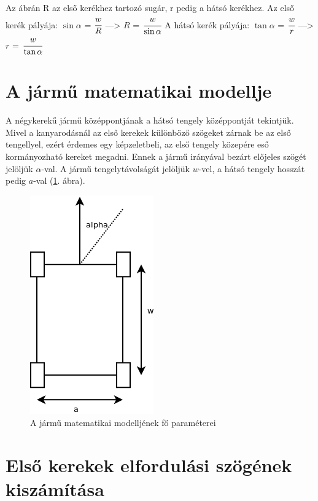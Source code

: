 \documentclass[a4paper]{paper}
\begin{document}
Az ábrán R az első kerékhez tartozó sugár, r pedig a hátsó kerékhez.\newline
Az első kerék pályája: $\sin\alpha$ = $\cfrac{w}{R}$ \hspace{5mm}---> \hspace{5mm} $R$ = $\cfrac{w}{\sin\alpha}$ \newline
A hátsó kerék pályája: $\tan\alpha$ = $\cfrac{w}{r}$ \hspace{5mm}---> \hspace{5mm} $r$ = $\cfrac{w}{\tan\alpha}$
\newpage

\section{A jármű matematikai modellje}

A négykerekű jármű középpontjának a hátsó tengely középpontját tekintjük. Mivel a kanyarodásnál az első kerekek különböző szögeket zárnak be az első tengellyel, ezért érdemes egy képzeletbeli, az első tengely közepére eső kormányozható kereket megadni. Ennek a jármű irányával bezárt előjeles szögét jelöljük $\alpha$-val. A jármű tengelytávolságát jelöljük $w$-vel, a hátsó tengely hosszát pedig $a$-val (\ref{fig:vehicle}. ábra).

\begin{figure}[h!]
\centering
\includegraphics[scale=0.45]{images/vehicle.png}
\caption{A jármű matematikai modelljének fő paraméterei}
\label{fig:vehicle}
\end{figure}

\section{Első kerekek elfordulási szögének kiszámítása}
\end{document}
